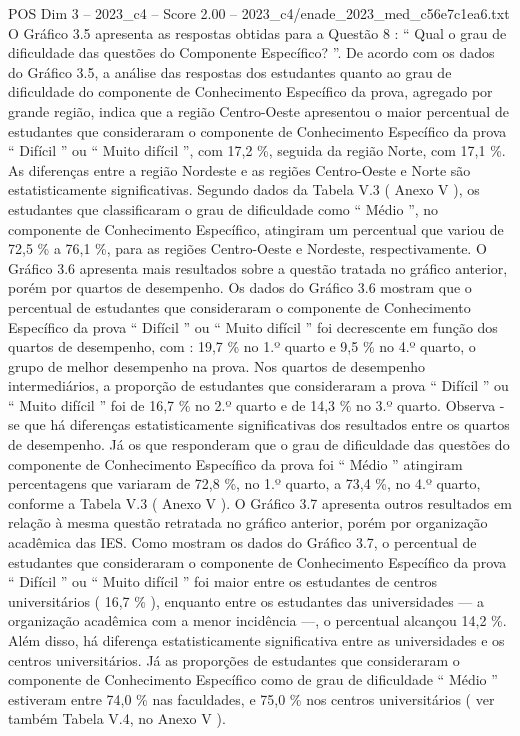 \begin{textsample}{POS Dim 3 – 2023\_c4 – Score 2.00 – 2023\_c4/enade\_2023\_med\_c56e7c1ea6.txt}
O Gráfico 3.5 apresenta as respostas obtidas para a Questão 8 : “ Qual o grau de dificuldade das questões do Componente Específico? ”.
De acordo com os dados do Gráfico 3.5, a análise das respostas dos estudantes quanto ao grau de dificuldade do componente de Conhecimento Específico da prova, agregado por grande região, indica que a região Centro-Oeste apresentou o maior percentual de estudantes que consideraram o componente de Conhecimento Específico da prova “ Difícil ” ou “ Muito difícil ”, com 17,2 \%, seguida da região Norte, com 17,1 \%.
As diferenças entre a região Nordeste e as regiões Centro-Oeste e Norte são estatisticamente significativas.
Segundo dados da Tabela V.3 ( Anexo V ), os estudantes que classificaram o grau de dificuldade como “ Médio ”, no componente de Conhecimento Específico, atingiram um percentual que variou de 72,5 \% a 76,1 \%, para as regiões Centro-Oeste e Nordeste, respectivamente.
O Gráfico 3.6 apresenta mais resultados sobre a questão tratada no gráfico anterior, porém por quartos de desempenho.
Os dados do Gráfico 3.6 mostram que o percentual de estudantes que consideraram o componente de Conhecimento Específico da prova “ Difícil ” ou “ Muito difícil ” foi decrescente em função dos quartos de desempenho, com : 19,7 \% no 1.º quarto e 9,5 \% no 4.º quarto, o grupo de melhor desempenho na prova.
Nos quartos de desempenho intermediários, a proporção de estudantes que consideraram a prova “ Difícil ” ou “ Muito difícil ” foi de 16,7 \% no 2.º quarto e de 14,3 \% no 3.º quarto.
Observa -se que há diferenças estatisticamente significativas dos resultados entre os quartos de desempenho.
Já os que responderam que o grau de dificuldade das questões do componente de Conhecimento Específico da prova foi “ Médio ” atingiram percentagens que variaram de 72,8 \%, no 1.º quarto, a 73,4 \%, no 4.º quarto, conforme a Tabela V.3 ( Anexo V ).
O Gráfico 3.7 apresenta outros resultados em relação à mesma questão retratada no gráfico anterior, porém por organização acadêmica das IES.
Como mostram os dados do Gráfico 3.7, o percentual de estudantes que consideraram o componente de Conhecimento Específico da prova “ Difícil ” ou “ Muito difícil ” foi maior entre os estudantes de centros universitários ( 16,7 \% ), enquanto entre os estudantes das universidades — a organização acadêmica com a menor incidência —, o percentual alcançou 14,2 \%.
Além disso, há diferença estatisticamente significativa entre as universidades e os centros universitários.
Já as proporções de estudantes que consideraram o componente de Conhecimento Específico como de grau de dificuldade “ Médio ” estiveram entre 74,0 \% nas faculdades, e 75,0 \% nos centros universitários ( ver também Tabela V.4, no Anexo V ).

\end{textsample}
